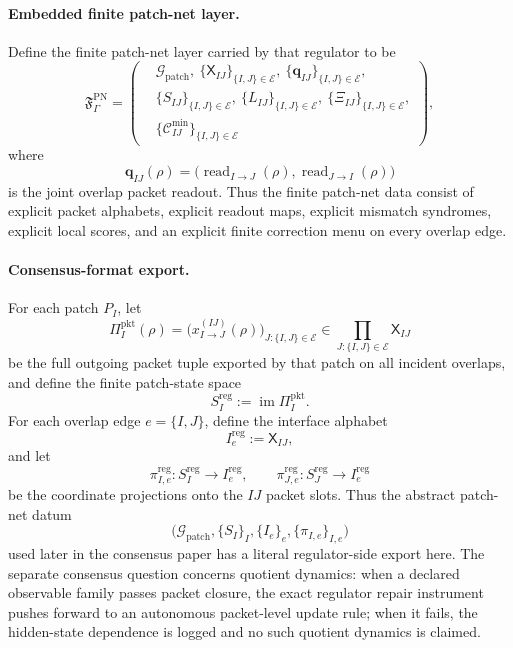\documentclass[11pt]{article}
\begin{document}
\paragraph{Embedded finite patch-net layer.}
Define the finite patch-net layer carried by that regulator to be
\begin{equation}
\mathfrak F_{\Gamma}^{\mathrm{PN}}
=
\left(
\begin{aligned}
&\mathcal G_{\mathrm{patch}},
\ \{\mathsf X_{IJ}\}_{\{I,J\}\in\mathcal E},
\ \{\mathbf q_{IJ}\}_{\{I,J\}\in\mathcal E},\\
&\{S_{IJ}\}_{\{I,J\}\in\mathcal E},
\ \{L_{IJ}\}_{\{I,J\}\in\mathcal E},
\ \{\Xi_{IJ}\}_{\{I,J\}\in\mathcal E},\\
&\{\mathcal C_{IJ}^{\mathrm{min}}\}_{\{I,J\}\in\mathcal E}
\end{aligned}
\right),
\end{equation}
where
\begin{equation}
\mathbf q_{IJ}(\rho)
=
\bigl(
\operatorname{read}_{I\to J}(\rho),
\operatorname{read}_{J\to I}(\rho)
\bigr)
\end{equation}
is the joint overlap packet readout. Thus the finite patch-net data consist of explicit packet
alphabets, explicit readout maps, explicit mismatch syndromes, explicit local scores, and an
explicit finite correction menu on every overlap edge.

\paragraph{Consensus-format export.}
For each patch $P_I$, let
\begin{equation}
\Pi_I^{\mathrm{pkt}}(\rho)
=
\bigl(
x_{I\to J}^{(IJ)}(\rho)
\bigr)_{J:\{I,J\}\in\mathcal E}
\in
\prod_{J:\{I,J\}\in\mathcal E}\mathsf X_{IJ}
\end{equation}
be the full outgoing packet tuple exported by that patch on all incident overlaps, and define the
finite patch-state space
\begin{equation}
S_I^{\mathrm{reg}}
:=
\operatorname{im}\Pi_I^{\mathrm{pkt}}.
\end{equation}
For each overlap edge $e=\{I,J\}$, define the interface alphabet
\begin{equation}
I_e^{\mathrm{reg}}:=\mathsf X_{IJ},
\end{equation}
and let
\begin{equation}
\pi_{I,e}^{\mathrm{reg}}:S_I^{\mathrm{reg}}\to I_e^{\mathrm{reg}},
\qquad
\pi_{J,e}^{\mathrm{reg}}:S_J^{\mathrm{reg}}\to I_e^{\mathrm{reg}}
\end{equation}
be the coordinate projections onto the $IJ$ packet slots. Thus the abstract patch-net datum
\[
\bigl(
\mathcal G_{\mathrm{patch}},
\{S_I\}_I,
\{I_e\}_e,
\{\pi_{I,e}\}_{I,e}
\bigr)
\]
used later in the consensus paper has a literal regulator-side export here. The separate consensus
question concerns quotient dynamics: when a declared observable family passes packet closure, the exact regulator repair
instrument pushes forward to an autonomous packet-level update rule; when it fails, the hidden-state
dependence is logged and no such quotient dynamics is claimed.
\end{document}
